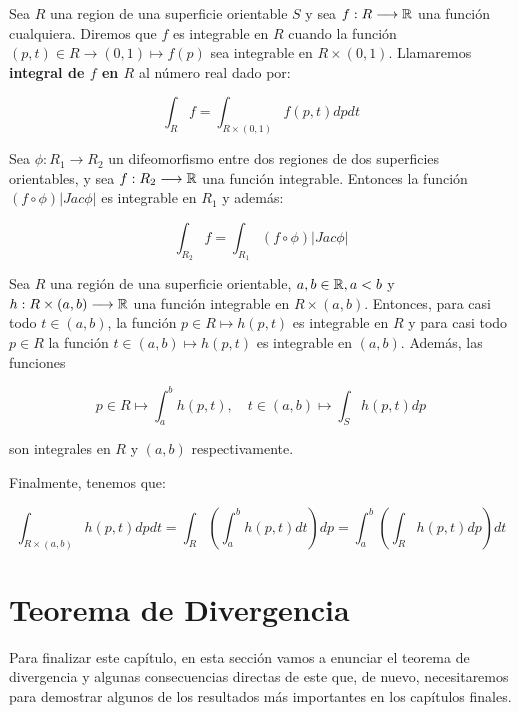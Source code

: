 \begin{definition}[Integral en $S$]
Sea $R$ una region de una superficie orientable $S$ y sea $f:R \longrightarrow \mathbb{R}$ una función cualquiera. Diremos que $f$ es integrable en $R$ cuando la función $(p,t) \in R \longrightarrow (0,1) \mapsto f(p)$ sea integrable en $R \times (0,1)$. Llamaremos \textbf{integral de $f$ en $R$} al número real dado por:

\begin{equation*}
    \int_{R} f = \int_{R \times (0,1)} f(p,t)dp dt
\end{equation*}
\end{definition}

\begin{theorem}
Sea $\phi:R_1 \longrightarrow R_2$ un difeomorfismo entre dos regiones de dos superficies orientables, y sea $f: R_2 \longrightarrow \mathbb{R}$ una función integrable. Entonces la función $(f \circ \phi)|Jac \phi|$ es integrable en $R_1$ y además:

\begin{equation*}
    \int_{R_2} f = \int_{R_1} (f \circ \phi)|Jac \phi|
\end{equation*}
\end{theorem}

\begin{theorem}
Sea $R$ una región de una superficie orientable, $a,b \in \mathbb{R}, a < b$ y $h:R \times (a,b) \longrightarrow \mathbb{R}$ una función integrable en $R \times (a,b)$. Entonces, para casi todo $t \in (a,b)$, la función $p \in R \mapsto h(p,t)$ es integrable en $R$ y para casi todo $p \in R$ la función $t \in (a,b) \mapsto h(p,t)$ es integrable en $(a,b)$. Además, las funciones

\begin{equation*}
    p \in R \mapsto \int_a^b h(p,t), \quad  t \in (a,b) \mapsto \int_S h(p,t) dp
\end{equation*}

son integrales en $R$ y $(a,b)$ respectivamente.

Finalmente, tenemos que:

\begin{equation*}
    \int_{R \times (a,b)} h(p,t) dpdt = \int_R \left( \int_a^b h(p,t)dt \right) dp = \int_a^b \left( \int_R h(p,t)dp \right) dt
\end{equation*}
\end{theorem}


\section{Teorema de Divergencia}
Para finalizar este capítulo, en esta sección vamos a enunciar el teorema de divergencia y algunas consecuencias directas de este que, de nuevo, necesitaremos para demostrar algunos de los resultados más importantes en los capítulos finales.

